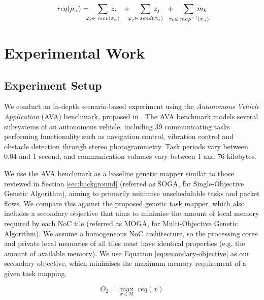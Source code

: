 \documentclass[10pt,conference]{IEEEtran}
\begin{document}
\vspace{-2ex}
\begin{equation}
  \label{eq:memory-model-c}
  req(\mu_\alpha) =
  \phantom{...} \sum_{\mathclap{\varphi_i \in \phantom{.}recv(\pi_\alpha)}}\phantom{.} z_i
  \phantom{...}+\phantom{....} \sum_{\mathclap{\varphi_j \in \phantom{.}send(\pi_\alpha)}} \phantom{.} z_j
  \phantom{...}+\phantom{....} \sum_{\mathclap{\tau_k \in \phantom{.}map^{-1}(\pi_\alpha)}}\phantom{.} m_k
\end{equation}
\vspace{0.3ex}

\section{Experimental Work}\label{sec:experimental-work}

\subsection{Experiment Setup}\label{sec:experiment-setup}

We conduct an in-depth scenario-based experiment using the \textit{Autonomous Vehicle Application} (AVA) benchmark, proposed in \cite{Shi10}. The AVA benchmark models several subsystems of an autonomous vehicle, including 39 communicating tasks performing functionality such as navigation control, vibration control and obstacle detection through stereo photogrammetry. Task periods vary between 0.04 and 1 second, and communication volumes vary between 1 and 76 kilobytes.

We use the AVA benchmark as a baseline genetic mapper similar to those reviewed in Section \ref{sec:background} (referred as SOGA, for Single-Objective Genetic Algorithm), aiming to primarily minimise unschedulable tasks and packet flows. We compare this against the proposed genetic task mapper, which also includes a secondary objective that aims to minimise the amount of local memory required by each NoC tile (referred as MOGA, for Multi-Objective Genetic Algorithm). We assume a homogeneous NoC architecture, so the processing cores and private local memories of all tiles must have identical properties (e.g. the amount of available memory). We use Equation \ref{eq:secondary-objective} as our secondary objective, which minimises the maximum memory requirement of a given task mapping.

\vspace{-0.5ex}
\begin{equation}
  \label{eq:secondary-objective}
  O_2 = \max_{x \in \mathrm{M}}\phantom{.}{req(x)}
\end{equation}
\end{document}
